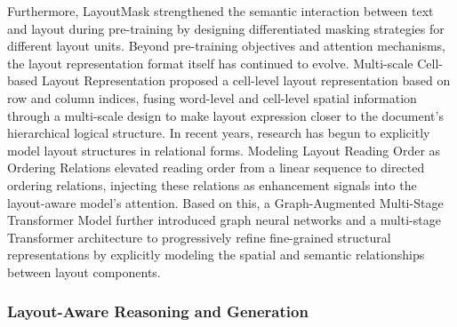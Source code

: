 Furthermore, LayoutMask \cite{tu2023layoutmask} strengthened the semantic interaction between text and layout during pre-training by designing differentiated masking strategies for different layout units. Beyond pre-training objectives and attention mechanisms, the layout representation format itself has continued to evolve. Multi-scale Cell-based Layout Representation \cite{shi2023multiscale_cell} proposed a cell-level layout representation based on row and column indices, fusing word-level and cell-level spatial information through a multi-scale design to make layout expression closer to the document’s hierarchical logical structure. In recent years, research has begun to explicitly model layout structures in relational forms. Modeling Layout Reading Order as Ordering Relations \cite{zhang2024reading_order_relations} elevated reading order from a linear sequence to directed ordering relations, injecting these relations as enhancement signals into the layout-aware model’s attention. Based on this, a Graph-Augmented Multi-Stage Transformer Model \cite{arshad2025graph_augmented} further introduced graph neural networks and a multi-stage Transformer architecture to progressively refine fine-grained structural representations by explicitly modeling the spatial and semantic relationships between layout components.

\subsubsection{Layout-Aware Reasoning and Generation}

